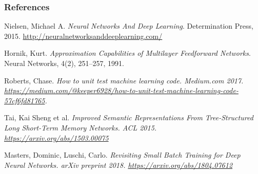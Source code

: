 \documentclass{beamer}
\begin{document}
%   
   \begin{frame}
   	\frametitle{References}
   	\begin{thebibliography}{Hornik, 1991}

   Nielsen, Michael A. {\em Neural Networks And Deep Learning}. Determination Press, 2015. \url{http://neuralnetworksanddeeplearning.com/}
  
   Hornik, Kurt. {\em Approximation Capabilities of Multilayer Feedforward Networks}. Neural Networks, 4(2), 251--257, 1991.
  
   Roberts, Chase. \em{How to unit test machine learning code.} Medium.com 2017. \url{https://medium.com/@keeper6928/how-to-unit-test-machine-learning-code-57cf6fd81765}.
  
   Tai, Kai Sheng et al. \em{Improved Semantic Representations From Tree-Structured Long Short-Term Memory Networks.} ACL 2015. \url{https://arxiv.org/abs/1503.00075}
   
   Masters, Dominic, Luschi, Carlo. \em{Revisiting Small Batch Training for Deep Neural Networks.} arXiv preprint 2018. \url{https://arxiv.org/abs/1804.07612}
   
	\end{thebibliography}   
   \end{frame}  
\end{document}
